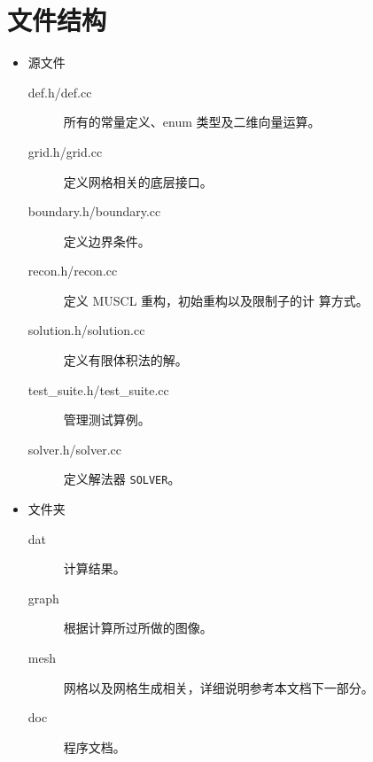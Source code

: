 \section{文件结构}
\label{sec:file-struct}
\begin{itemize}
\item 源文件
  \begin{description}
  \item[def.h/def.cc] 所有的常量定义、enum 类型及二维向量运算。
  \item[grid.h/grid.cc] 定义网格相关的底层接口。
  \item[boundary.h/boundary.cc] 定义边界条件。
  \item[recon.h/recon.cc] 定义 MUSCL 重构，初始重构以及限制子的计
    算方式。
  \item[solution.h/solution.cc] 定义有限体积法的解。
  \item[test\_suite.h/test\_suite.cc] 管理测试算例。
  \item[solver.h/solver.cc] 定义解法器 \verb|SOLVER|。
  \item[]
  \end{description}
\item 文件夹
  \begin{description}
  \item[dat] 计算结果。
  \item[graph] 根据计算所过所做的图像。
  \item[mesh] 网格以及网格生成相关，详细说明参考本文档下一部分。
  \item[doc] 程序文档。
  \end{description}
\end{itemize}

